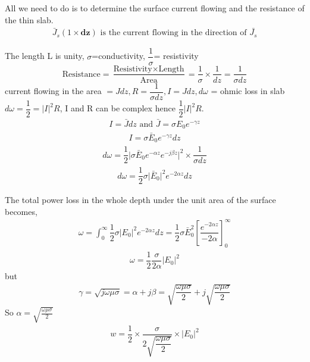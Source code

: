 All we need to do is to determine the surface current flowing and the resistance of the thin slab.
\begin{align*}
\bar{J}_s(1\times\mathbf{dz})\text{ is the current flowing in the direction of } \bar{J_{s}}
\end{align*}

\begin{center}
The length L is unity,
$\sigma$=conductivity,
$\dfrac{1}{\sigma}$= resistivity
\begin{dmath*}
\text{Resistance} = \dfrac{\text{Resistivity} \times \text{Length}}{\text{Area}}=\dfrac{1}{\sigma}\times\dfrac{1}{dz}=\dfrac{1}{\sigma dz}
\end{dmath*}
current flowing in the area $=Jdz, R=\dfrac{1}{\sigma dz}, I=Jdz, d\omega$ = ohmic loss in slab \\
$d\omega=\dfrac{1}{2}={\lvert I\rvert}^{2}R$, 
I and R can be complex hence $\dfrac{1}{2}{\lvert I\rvert}^{2}R$.
\begin{align*}
I=\bar{J}dz \text{ and } \bar{J} = \sigma E_{0} e^{-\gamma z}
\end{align*}
\begin{align*}
I=\sigma\bar{E}_{0}e^{-\gamma z}dz
\end{align*}
\begin{align*}
d\omega=\dfrac{1}{2}\lvert\sigma\bar{E}_{0}e^{-\alpha z}e^{-j\beta z}\rvert^{2}\times\dfrac{1}{\sigma dz}
\end{align*}
\begin{align*}
d\omega=\dfrac{1}{2}\sigma\lvert\bar{E}_{0}\rvert^{2}e^{-2\alpha z}dz
\end{align*}
\end{center}
The total power loss in the whole depth under the unit area of the surface becomes,
\begin{align}
\omega=\int_{0}^{\infty}\dfrac{1}{2}\sigma\lvert E_{0}\rvert^{2}e^{-2\alpha z}dz=\dfrac{1}{2}\sigma\bar{E}_{0}^{2}[\dfrac{e^{-2\alpha z}}{-2\alpha}]_{0}^{\infty}
\end{align}
\begin{align}
\omega=\dfrac{1}{2}\dfrac{\sigma}{2\alpha}\lvert E_{0}\rvert^{2}
\end{align}
but
\begin{align}
\gamma=\sqrt{j\omega\mu\sigma}=\alpha+j\beta=\sqrt{\dfrac{\omega\mu\sigma}{2}}+j\sqrt{\dfrac{\omega\mu\sigma}{2}}
\end{align}
So $\alpha = \sqrt{\frac{\omega\mu\sigma}{2}}$
\begin{align}
w = 	\dfrac{1}{2}\times\dfrac{\sigma}{2\sqrt{\dfrac{\omega\mu\sigma}{2}}}\times\lvert E_{0}\rvert^{2}
\end{align}
